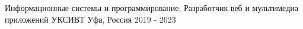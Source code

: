 

\begin{cventries}

  \cventry
    {Информационные системы и программирование, Разработчик веб и мультимедиа приложений} %
    {УКСИВТ} %
    {Уфа, Россия} %
    {2019 - 2023} %
    {}

\end{cventries}
